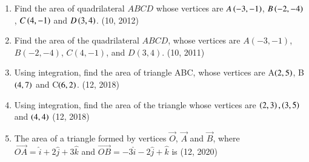 \begin{enumerate}[label=\thesubsection.\arabic*,ref=\thesubsection.\theenumi]
\item Find the area of quadrilateral $ABCD$ whose vertices are $A\left(-3,-1\right)$, $B\left(-2,-4\right)$, $C\left(4,-1\right)$ and $D\left(3,4\right)$.
\hfill (10, 2012)
\item Find the area of the quadrilateral $ABCD$, whose vertices are $A(-3, -1)$, $B(-2, -4)$, $C(4, -1)$, and $D(3, 4)$.
\hfill (10, 2011)
\item Using integration, find the area of triangle ABC, whose vertices are A$\left(2, 5\right)$, B$\left(4, 7\right)$ and C$\left(6, 2\right)$.
\hfill (12, 2018)
\item Using integration, find the area of the triangle whose vertices are $\left(2,3\right),\left(3,5\right)$ and $\left(4,4\right)$
\hfill (12, 2018)
\item The area of a triangle formed by vertices $\vec{O}$, $\vec{A}$ and $\vec{B}$, where $\overrightarrow{OA}= \hat{i}+2 \hat{j}+3\hat{k}$ and $\overrightarrow{OB}= -3\hat{i} - 2\hat{j} + \hat{k}$ is
\hfill (12, 2020)

\end{enumerate}
